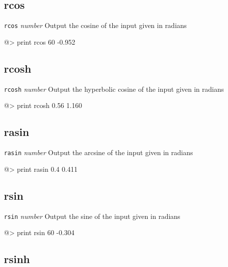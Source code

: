 \subsection*{rcos}  
 
{\tt rcos} {\it number} 
\newline\newline 
Output the cosine of the input given in radians 
\begin{verbatimtab} 
@> print rcos 60 
-0.952 
\end{verbatimtab}
 
\subsection*{rcosh}  
 
{\tt rcosh} {\it number} 
\newline\newline 
Output the hyperbolic cosine of the input given in radians 
\begin{verbatimtab} 
@> print rcosh 0.56 
1.160 
\end{verbatimtab}
 
\subsection*{rasin}  
 
{\tt rasin} {\it number} 
\newline\newline
Output the arcsine of the input given in radians 
\begin{verbatimtab} 
@> print rasin 0.4 
0.411 
\end{verbatimtab}
 
\subsection*{rsin}  
 
{\tt rsin} {\it number} 
\newline\newline 
Output the sine of the input given in radians 
\begin{verbatimtab} 
@> print rsin 60 
-0.304 
\end{verbatimtab}
 
\subsection*{rsinh}  
 
